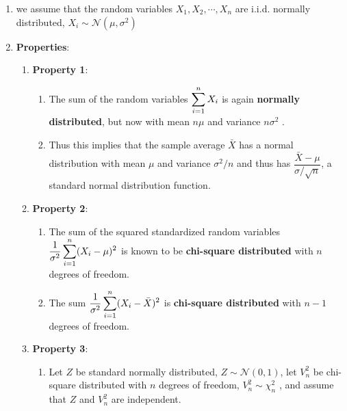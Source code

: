 \begin{enumerate}
    \item we assume that the random variables $X_1 , X_2, \cdots , X_ n$ are i.i.d. normally distributed, $X _i \sim \mathcal{N} (\mu, \sigma^ 2)$
    \hfill \cite{statistics/book/Statistics-for-Data-Scientists/Maurits-Kaptein}

    \item \textbf{Properties}:
    \begin{enumerate}
        \item \textbf{Property 1}:
        \hfill \cite{statistics/book/Statistics-for-Data-Scientists/Maurits-Kaptein}
        \begin{enumerate}
            \item The sum of the random variables $\displaystyle\sum^n _{i=1} X_ i$ is again \textbf{normally distributed}, but now with mean $n\mu$ and variance $n\sigma  ^2$ .
            \hfill \cite{statistics/book/Statistics-for-Data-Scientists/Maurits-Kaptein}

            \item Thus this implies that the sample average $\bar{X}$ has a normal distribution with mean $\mu$ and variance $\sigma ^ 2/n$ and thus has $\dfrac{\bar{X} - \mu}{\sigma /\sqrt{n}}$, a standard normal distribution function.
            \hfill \cite{statistics/book/Statistics-for-Data-Scientists/Maurits-Kaptein}
        \end{enumerate}

        \item \textbf{Property 2}:
        \begin{enumerate}
            \item The sum of the squared standardized random variables $\dfrac{1}{\sigma ^2} \displaystyle\sum^n _{i=1} (X _i - \mu)^2$ is known to be \textbf{chi-square distributed} with $n$ degrees of freedom.
            \hfill \cite{statistics/book/Statistics-for-Data-Scientists/Maurits-Kaptein}

            \item The sum $\dfrac{1}{\sigma ^2} \displaystyle\sum^n _{i=1} (X_ i - \bar{X} )^2$ is \textbf{chi-square distributed} with $n - 1$ degrees of freedom.
            \hfill \cite{statistics/book/Statistics-for-Data-Scientists/Maurits-Kaptein}
        \end{enumerate}

        \item \textbf{Property 3}:
        \begin{enumerate}
            \item Let $Z$ be standard normally distributed, $Z \sim \mathcal{N} (0, 1)$, let $V^ 2 _n$ be chi-square distributed with $n$ degrees of freedom, $V ^2 _n \sim \chi^2 _n$ , and assume that $Z$ and $V ^2 _n$ are independent.
            \hfill \cite{statistics/book/Statistics-for-Data-Scientists/Maurits-Kaptein}


\end{enumerate}
\end{enumerate}
\end{enumerate}
